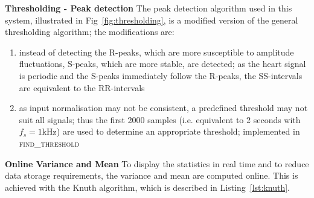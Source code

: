 \documentclass[11pt]{article}
\renewcommand\part[1]{\vspace{.10in}\textbf{#1}}
\begin{document}
\part{Thresholding - Peak detection} \newline
The peak detection algorithm used in this system, illustrated in Fig~\ref{fig:thresholding}, is a modified version of the general thresholding algorithm; the modifications are:
\begin{enumerate}
\item instead of detecting the R-peaks, which are more susceptible to amplitude fluctuations, S-peaks, which are more stable, are detected; as the heart signal is periodic and the S-peaks immediately follow the R-peaks, the SS-intervals are equivalent to the RR-intervals

\item as input normalisation may not be consistent, a predefined threshold may not suit all signals; thus the first 2000 samples (i.e. equivalent to 2 seconds with $f_s = 1$kHz) are used to determine an appropriate threshold; implemented in \textsc{find\_threshold}
\end{enumerate}

\part{Online Variance and Mean} \newline
To display the statistics in real time and to reduce data storage requirements, the variance and mean are computed online. This is achieved with the Knuth algorithm, which is described in Listing~\ref{lst:knuth}.
\end{document}

